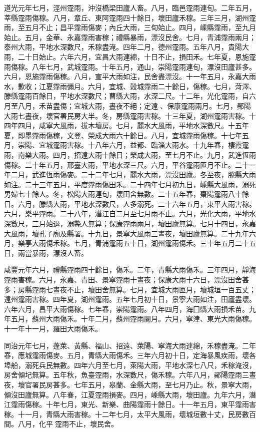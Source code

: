 \begin{pinyinscope}
道光元年七月，涇州霪雨，沖沒橋梁田廬人畜。八月，臨邑霪雨連旬。二年五月，莘縣霪雨傷稼。八月，章丘、東阿霪雨四十餘日，壞田廬禾稼。三年三月，湖州霪雨，至五月不止；昌平霪雨傷麥；內丘大雨，三旬始止。四月，嵊縣霪雨，至九月始止。五月，金華、永嘉霪雨害稼；禮縣暴雨，漂沒民舍。七月，青浦霪雨兩月；泰州大雨，平地水深數尺，禾稼盡淹。四年二月，德州霪雨。五年八月，貴陽大雨，二十日始止。六年六月，宜昌大雨連綿，十日不止，損田禾。七年夏，恩施霪雨傷稼。八年七月，武城霪雨。十年五月，通山，崇陽霪雨連旬，漂沒田廬甚多。六月，恩施霪雨傷稼。八月，宣平大雨如注，民舍盡漂沒。十一年五月，永嘉大雨水，歉收；江夏霪雨彌月。六月，宜城、穀城霪雨二十餘日，傷稼。七月，菏澤、滕縣霪雨百餘日，平地水深數尺；曹縣大雨，水深二尺。十二年，光化霪雨，自六月至八月，禾苗盡傷；宜城大雨，晝夜不絕；定遠、保康霪雨兩月。七月，鄖陽大雨七晝夜，壞官署民房大半。冬，房縣霪雨害稼。十三年夏，湖州霪雨害稼。十四年四月，咸寧大風雨，拔木壞房。七月，麗水大風雨，平地水深數尺。十五年夏，即墨霪雨傷稼，文登、榮成大雨六十餘日。八月，宜城霪雨傷稼。十七年五月，崇陽、宜城霪雨害稼。十八年六月，益都、臨淄大雨水。十九年春，棲霞霪雨，南樂大雨。四月，招遠大雨十餘日；榮成大雨，至七月不止。九月，武進恆雨傷稼。二十年五月，邢臺大雨，平地水深三尺。六月，平谷霪雨匝月不止。二十一年二月，武進恆雨傷麥。二十二年七月，麗水大雨，漂沒田廬。冬至夜，滕縣大雨如注。二十三年五月，平度霪雨傷田禾。二十四年七月初九日，嵊縣大風雨，溺死男婦七十餘人。冬，松陽大雨連旬，壞田舍無數。二十五年春，棗陽霪雨八十餘日。六月，滕縣大雨，平地水深數尺，人多溺死。二十六年五月，東平大雨害稼。六月，樂平霪雨。二十八年，潛江自二月至七月雨不止。六月，光化大雨，平地水深數尺，三月始退，溺斃人無算；保康霪雨兩月，壞田廬無算。七月十四日，永嘉大風雨，壞孔子廟及縣署。十九日，景寧大風雨三晝夜，壞田廬無算。二十九年六月，樂亭大雨傷禾稼。七月，青浦霪雨五十日，湖州霪雨傷禾。三十年五月二十五日，兩當暴雨，漂沒人畜。

咸豐元年六月，禮縣霪雨四十餘日，傷禾。二年，青縣大雨傷禾。三年四月，靜海霪雨害稼。六月，永嘉、青田、景寧霪雨十晝夜；保康大雨十六日，漂沒田舍甚多；房縣霪雨七晝夜不止，壞田舍無算。七月，宜城大雨匝月，壞城垣一百五丈；遠州霪雨害稼。四年夏，湖州霪雨。五年七月初十日，景寧大雨如注，田廬盡壞。六年六月，昌平大雨傷稼。七年春，崇陽霪雨。八年四月，海囗縣大雨損禾苗。九年五月，蘇州大雨傷禾。十年二月，蘇州霪雨閱月。六月，寧津、東光大雨傷稼。十一年十一月，羅田大雨傷禾。

同治元年七月，蓬萊、黃縣、福山、招遠、萊陽、寧海大雨連綿，禾稼盡淹。二年春，應城霪雨傷麥。五月，青縣大雨傷禾。三年六月初十日，定海暴風疾雨，壞各埠船，溺死兵民無數。四年六月至七月，萊陽大雨，平地水深七八尺，禾稼淹沒，房舍傾圮無算。五年秋，魚臺霪雨，水深數尺，傷禾稼。六年八月，鄖陽霪雨三晝夜，壞官署民房甚多。七年五月，皋蘭、金縣大雨，至七月乃止。秋，景寧大雨，傾沒田廬無算。八年春，江夏霪雨損麥。四月，嵊縣大雨，壞田廬。九年六月，潛江霪雨傷稼。十年七月，東光、新樂、曲陽霪雨十餘日。十一年五月，東平霪雨害稼。十一月，青縣大雨害稼。十二年七月，太平大風雨，壞城垣數十丈，民房數百間。八月，化平霪雨不止，壞民舍。


\end{pinyinscope}
